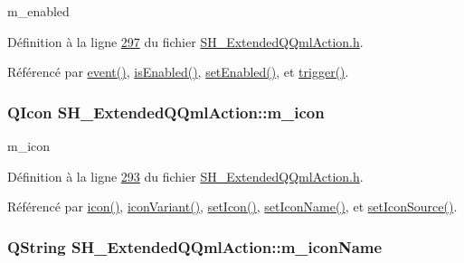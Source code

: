 m\-\_\-enabled 



Définition à la ligne \hyperlink{SH__ExtendedQQmlAction_8h_source_l00297}{297} du fichier \hyperlink{SH__ExtendedQQmlAction_8h_source}{S\-H\-\_\-\-Extended\-Q\-Qml\-Action.\-h}.



Référencé par \hyperlink{classSH__ExtendedQQmlAction_a218053d85e9fc54e06ab39b1bb37dd4b}{event()}, \hyperlink{classSH__ExtendedQQmlAction_a4da1f74b1aa64958ea18b2b55648b7db}{is\-Enabled()}, \hyperlink{classSH__ExtendedQQmlAction_aff39518e3dbf185d6b91f827521fa358}{set\-Enabled()}, et \hyperlink{classSH__ExtendedQQmlAction_abf79bb6cb923d27e2fc5dfc05ff513c2}{trigger()}.

\hypertarget{classSH__ExtendedQQmlAction_a4386f56e28c2c70cfedd16c1d8c2c4a4}{
\subsubsection[{m\-\_\-icon}]{\setlength{\rightskip}{0pt plus 5cm}Q\-Icon S\-H\-\_\-\-Extended\-Q\-Qml\-Action\-::m\-\_\-icon\hspace{0.3cm}{\ttfamily [private]}}}\label{classSH__ExtendedQQmlAction_a4386f56e28c2c70cfedd16c1d8c2c4a4}


m\-\_\-icon 



Définition à la ligne \hyperlink{SH__ExtendedQQmlAction_8h_source_l00293}{293} du fichier \hyperlink{SH__ExtendedQQmlAction_8h_source}{S\-H\-\_\-\-Extended\-Q\-Qml\-Action.\-h}.



Référencé par \hyperlink{classSH__ExtendedQQmlAction_a1ad6dd5cce1909ac371f70b5bc57d927}{icon()}, \hyperlink{classSH__ExtendedQQmlAction_a53e1244ef9cc77483684fdf57c236c76}{icon\-Variant()}, \hyperlink{classSH__ExtendedQQmlAction_aca3c862c9092a2cd7c2098f2132b0a45}{set\-Icon()}, \hyperlink{classSH__ExtendedQQmlAction_a348526d65cd47b4ea6378e2a62065135}{set\-Icon\-Name()}, et \hyperlink{classSH__ExtendedQQmlAction_ae34fe314ba335d65d99932b27f1404f7}{set\-Icon\-Source()}.

\hypertarget{classSH__ExtendedQQmlAction_a3375d1504e5ec862ed05500bf529d95c}{
\subsubsection[{m\-\_\-icon\-Name}]{\setlength{\rightskip}{0pt plus 5cm}Q\-String S\-H\-\_\-\-Extended\-Q\-Qml\-Action\-::m\-\_\-icon\-Name\hspace{0.3cm}{\ttfamily [private]}}}\label{classSH__ExtendedQQmlAction_a3375d1504e5ec862ed05500bf529d95c}


